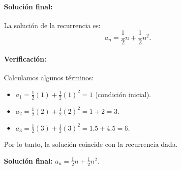 \documentclass{article}
\begin{document}
\paragraph{Solución final:}
La solución de la recurrencia es:
\[
a_n = \frac{1}{2}n + \frac{1}{2}n^2.
\]

\paragraph{Verificación:}
Calculamos algunos términos:
\begin{itemize}
    \item $a_1 = \frac{1}{2}(1) + \frac{1}{2}(1)^2 = 1$ (condición inicial).
    \item $a_2 = \frac{1}{2}(2) + \frac{1}{2}(2)^2 = 1 + 2 = 3$.
    \item $a_3 = \frac{1}{2}(3) + \frac{1}{2}(3)^2 = 1.5 + 4.5 = 6$.
\end{itemize}

Por lo tanto, la solución coincide con la recurrencia dada.

\begin{center}
    \textbf{Solución final:} $a_n = \frac{1}{2}n + \frac{1}{2}n^2$.
\end{center}


\begin{comment}
\begin{figure}[h]
    \centering
    \texttt{[image: 1.png]}
    \caption{}
\end{figure}
\end{comment}

\begin{comment}
\begin{wrapfigure}[]{r}{0.5\linewidth}
    \centering
    \texttt{[image: 8.png]}
    \caption{}
\end{wrapfigure}
\end{comment}
\end{document}
